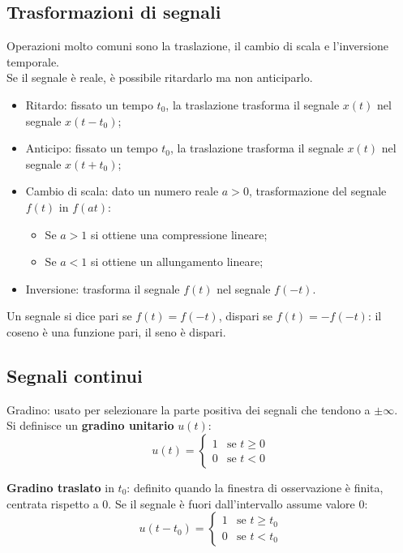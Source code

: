 \subsection{Trasformazioni di segnali}
Operazioni molto comuni sono la traslazione, il cambio di scala e l'inversione temporale. \\
Se il segnale è reale, è possibile ritardarlo ma non anticiparlo.
\begin{itemize}
	\item Ritardo: fissato un tempo $t_0$, la traslazione trasforma il segnale $x(t)$ nel segnale $x(t - t_0)$;
	\item Anticipo: fissato un tempo $t_0$, la traslazione trasforma il segnale $x(t)$ nel segnale $x(t + t_0)$;
	\item Cambio di scala: dato un numero reale $a > 0$, trasformazione del segnale $f(t)$ in $f(at)$:
	\begin{itemize}
		\item Se $a > 1$ si ottiene una compressione lineare;
		\item Se $a < 1$ si ottiene un allungamento lineare;
	\end{itemize}
	\item Inversione: trasforma il segnale $f(t)$ nel segnale $f(-t)$.
\end{itemize}

Un segnale si dice pari se $f(t) = f(-t)$, dispari se $f(t) = -f(-t)$: il coseno è una funzione pari, il seno è dispari.

\subsection{Segnali continui}
Gradino: usato per selezionare la parte positiva dei segnali che tendono a $\pm \infty$. \\
Si definisce un \textbf{gradino unitario} $u(t)$:
$$u(t) = \begin{cases}
1 & \text{se } t \geq 0 \\
0 & \text{se } t < 0
\end{cases}$$

\textbf{Gradino traslato} in $t_0$: definito quando la finestra di osservazione è finita, centrata rispetto a 0. Se il segnale è fuori dall'intervallo assume valore 0:
$$u(t - t_0) = \begin{cases}
1 & \text{se } t \geq t_0 \\
0 & \text{se } t < t_0
\end{cases}$$

